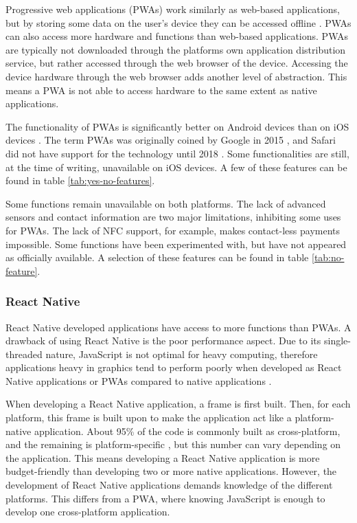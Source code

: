 Progressive web applications (PWAs) work similarly as web-based applications, but by storing some data on the user’s device they can be accessed offline \cite{AppsWhatsTheDifference}.  PWAs can also access more hardware and functions than web-based applications. PWAs are typically not downloaded through the platforms own application distribution service, but rather accessed through the web browser of the device. 
Accessing the device hardware through the web browser adds another level of abstraction. This means a PWA is not able to access hardware to the same extent as native applications. 

The functionality of PWAs is significantly better on Android devices than on iOS devices \cite{AppsWhatsTheDifference}. The term PWAs was originally coined by Google in 2015  \cite{PWABook2019}, and Safari did not have support for the technology until 2018  \cite{PWAiOS,iOS113}. Some functionalities are still, at the time of writing, unavailable on iOS devices. A few of these features can be found in table \ref{tab:yes-no-features}.



Some functions remain unavailable on both platforms. The lack of advanced sensors and contact information are two major limitations, inhibiting some uses for PWAs. The lack of NFC support, for example, makes contact-less payments impossible. Some functions have been experimented with, but have not appeared as officially available. A selection of these features can be found in table \ref{tab:no-feature}.



\subsubsection{React Native}

React Native developed applications have access to more functions than PWAs. A drawback of using React Native is the poor performance aspect. Due to its single-threaded nature, JavaScript is not optimal for heavy computing, therefore applications heavy in graphics tend to perform poorly when developed as React Native applications or PWAs compared to native applications \cite{JSmultithread}.

When developing a React Native application, a frame is first built. Then, for each platform, this frame is built upon to make the application act like a platform-native application. About 95\% of the code is commonly built as cross-platform, and the remaining is platform-specific \cite{Ganguly2018}, but this number can vary depending on the application. This means developing a React Native application is more budget-friendly than developing two or more native applications. However, the development of React Native applications demands knowledge of the different platforms. This differs from a PWA, where knowing JavaScript is enough to develop one cross-platform application.

